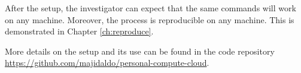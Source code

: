 After the setup, the investigator can expect that the same commands will work on any machine.
%
Moreover, the process is reproducible on any machine.
%
This is demonstrated in Chapter \ref{ch:reproduce}.


More details on the setup and its use can be found in the code repository \url{https://github.com/majidaldo/personal-compute-cloud}.








